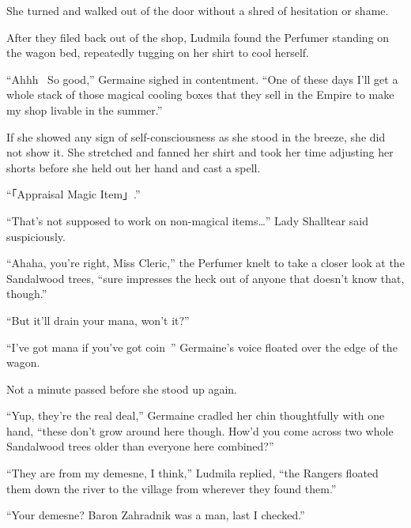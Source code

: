  

She turned and walked out of the door without a shred of hesitation or shame.

 

After they filed back out of the shop, Ludmila found the Perfumer standing on the wagon bed, repeatedly tugging on her shirt to cool herself.

 

“Ahhh~ So good,” Germaine sighed in contentment. “One of these days I’ll get a whole stack of those magical cooling boxes that they sell in the Empire to make my shop livable in the summer.”

 

If she showed any sign of self-consciousness as she stood in the breeze, she did not show it. She stretched and fanned her shirt and took her time adjusting her shorts before she held out her hand and cast a spell.

 

“「Appraisal Magic Item」.”

 

“That’s not supposed to work on non-magical items…” Lady Shalltear said suspiciously.

 

“Ahaha, you’re right, Miss Cleric,” the Perfumer knelt to take a closer look at the Sandalwood trees, “sure impresses the heck out of anyone that doesn’t know that, though.”

 

“But it’ll drain your mana, won’t it?”

 

“I’ve got mana if you’ve got coin~” Germaine’s voice floated over the edge of the wagon.

 

Not a minute passed before she stood up again.

 

“Yup, they’re the real deal,” Germaine cradled her chin thoughtfully with one hand, “these don’t grow around here though. How’d you come across two whole Sandalwood trees older than everyone here combined?”

 

“They are from my demesne, I think,” Ludmila replied, “the Rangers floated them down the river to the village from wherever they found them.”

 

“Your demesne? Baron Zahradnik was a man, last I checked.”

 

